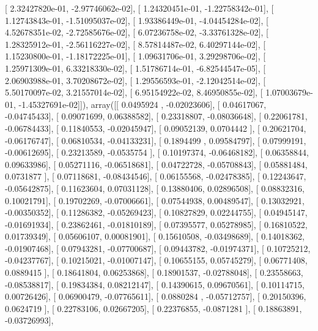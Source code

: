 \documentclass{article}
\begin{document}
       [  2.32427820e-01,  -2.97746062e-02],
       [  1.24320451e-01,  -1.22758342e-01],
       [  1.12743843e-01,  -1.51095037e-02],
       [  1.93386449e-01,  -4.04454284e-02],
       [  4.52678351e-02,  -2.72585676e-02],
       [  6.07236758e-02,  -3.33761328e-02],
       [  1.28325912e-01,  -2.56116227e-02],
       [  8.57814487e-02,   6.40297144e-02],
       [  1.15230800e-01,  -1.18172225e-01],
       [  1.09631706e-01,   3.29298706e-02],
       [  1.25971309e-01,   6.33218330e-02],
       [  1.51786714e-01,  -6.82544547e-05],
       [  2.06903988e-01,   3.70208672e-02],
       [  1.29556593e-01,  -2.12042514e-02],
       [  5.50170097e-02,   3.21557014e-02],
       [  6.95154922e-02,   8.46950855e-02],
       [  1.07003679e-01,  -1.45327691e-02]]), array([[ 0.0495924 , -0.02023606],
       [ 0.04617067, -0.04745433],
       [ 0.09071699,  0.06388582],
       [ 0.23318807, -0.08036648],
       [ 0.22061781, -0.06784433],
       [ 0.11840553, -0.02045947],
       [ 0.09052139,  0.0704442 ],
       [ 0.20621704, -0.06176747],
       [ 0.06810534, -0.04133231],
       [ 0.1894499 ,  0.09584797],
       [ 0.07999191, -0.00612695],
       [ 0.23213589, -0.0535754 ],
       [ 0.10197374, -0.06468182],
       [ 0.06358844,  0.09633986],
       [ 0.05271116, -0.06518681],
       [ 0.04722728, -0.05708843],
       [ 0.05881484,  0.0731877 ],
       [ 0.07118681, -0.08434546],
       [ 0.06155568, -0.02478385],
       [ 0.12243647, -0.05642875],
       [ 0.11623604,  0.07031128],
       [ 0.13880406,  0.02896508],
       [ 0.08832316,  0.10021791],
       [ 0.19702269, -0.07006661],
       [ 0.07544938,  0.00489547],
       [ 0.13032921, -0.00350352],
       [ 0.11286382, -0.05269423],
       [ 0.10827829,  0.02244755],
       [ 0.04945147, -0.01691934],
       [ 0.23862461, -0.01810189],
       [ 0.07395577,  0.05278985],
       [ 0.16810522,  0.01739349],
       [ 0.05606107,  0.00081901],
       [ 0.15610508, -0.03498689],
       [ 0.14018362, -0.01907468],
       [ 0.07943281, -0.07700687],
       [ 0.09443782, -0.01974371],
       [ 0.10725212, -0.04237767],
       [ 0.10215021, -0.01007147],
       [ 0.10655155,  0.05745279],
       [ 0.06771408,  0.0889415 ],
       [ 0.18641804,  0.06253868],
       [ 0.18901537, -0.02788048],
       [ 0.23558663, -0.08538817],
       [ 0.19834384,  0.08212147],
       [ 0.14390615,  0.09670561],
       [ 0.10114715,  0.00726426],
       [ 0.06900479, -0.07765611],
       [ 0.0880284 , -0.05712757],
       [ 0.20150396,  0.0624719 ],
       [ 0.22783106,  0.02667205],
       [ 0.22376855, -0.0871281 ],
       [ 0.18863891, -0.03726993],
\end{document}
